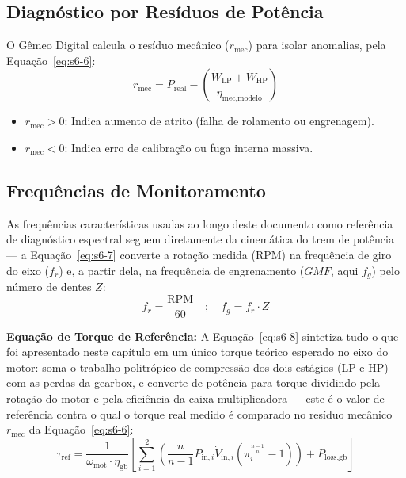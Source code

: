 \documentclass[12pt,a4paper]{article}
\numberwithin{equation}{section}
\numberwithin{table}{section}
\numberwithin{figure}{section}
\begin{document}
{	\subsection{\textbf{Diagnóstico por Resíduos de Potência}}
	O Gêmeo Digital calcula o resíduo mecânico ($r_{\text{mec}}$) para isolar anomalias, pela Equação~\eqref{eq:s6-6}:
	\begin{equation}\label{eq:s6-6}
 r_{\text{mec}} = P_{\text{real}} - \left( \frac{\dot{W}_{\text{LP}} + \dot{W}_{\text{HP}}}{\eta_{\text{mec,modelo}}} \right) 
\end{equation}
	\begin{itemize}
		\item $r_{\text{mec}} > 0$: Indica aumento de atrito (falha de rolamento ou engrenagem).
		\item $r_{\text{mec}} < 0$: Indica erro de calibração ou fuga interna massiva.
	\end{itemize}
	
	\subsection{\textbf{Frequências de Monitoramento}}
	As frequências características usadas ao longo deste documento como referência de diagnóstico espectral seguem diretamente da cinemática do trem de potência — a Equação~\eqref{eq:s6-7} converte a rotação medida (RPM) na frequência de giro do eixo ($f_r$) e, a partir dela, na frequência de engrenamento ($GMF$, aqui $f_g$) pelo número de dentes $Z$:
	\begin{equation}\label{eq:s6-7}
 f_r = \frac{\text{RPM}}{60} \quad ; \quad f_g = f_r \cdot Z
\end{equation}

	\vspace{1em}
	\textbf{Equação de Torque de Referência:} A Equação~\eqref{eq:s6-8} sintetiza tudo o que foi apresentado neste capítulo em um único torque teórico esperado no eixo do motor: soma o trabalho politrópico de compressão dos dois estágios (LP e HP) com as perdas da gearbox, e converte de potência para torque dividindo pela rotação do motor e pela eficiência da caixa multiplicadora — este é o valor de referência contra o qual o torque real medido é comparado no resíduo mecânico $r_{\text{mec}}$ da Equação~\eqref{eq:s6-6}:
	\begin{equation}\label{eq:s6-8}
 \boxed{\tau_{\text{ref}} = \frac{1}{\omega_{\text{mot}} \cdot \eta_{\text{gb}}} \left[ \sum_{i=1}^{2} \left( \frac{n}{n-1} P_{\text{in},i} \dot{V}_{\text{in},i} \left( \pi_i^{\frac{n-1}{n}} - 1 \right) \right) + P_{\text{loss,gb}} \right]}
\end{equation}

}
\end{document}
